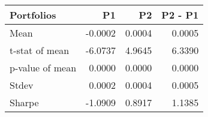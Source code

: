 \begin{tabular}{lrrr}
\toprule
Portfolios & P1 & P2 & P2 - P1 \\
\midrule
Mean & -0.0002 & 0.0004 & 0.0005 \\
t-stat of mean & -6.0737 & 4.9645 & 6.3390 \\
p-value of mean & 0.0000 & 0.0000 & 0.0000 \\
Stdev & 0.0002 & 0.0004 & 0.0005 \\
Sharpe & -1.0909 & 0.8917 & 1.1385 \\
\bottomrule
\end{tabular}
